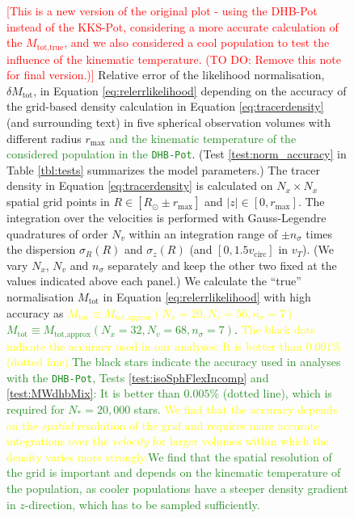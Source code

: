 \documentclass[iop,revtex4,numberedappendix,appendixfloats]{emulateapj}
\newcommand{\NEW}[1]{\textcolor{ForestGreen}{#1}}
\newcommand{\OLD}[1]{\textcolor{Yellow}{#1}}%
\newcommand{\NOTE}[1]{\textcolor{Red}{#1}}
\begin{document}
\begin{figure}[!htbp]
\centering
{}
\caption{\NOTE{[This is a new version of the original plot - using the DHB-Pot instead of the KKS-Pot, considering a more accurate calculation of the $M_\text{tot,true}$, and we also considered a cool population to test the influence of the kinematic temperature. (TO DO: Remove this note for final version.)]} Relative error of the likelihood normalisation, $\delta M_\text{tot}$, in Equation \eqref{eq:relerrlikelihood} depending on the accuracy of the grid-based density calculation in Equation \eqref{eq:tracerdensity} (and surrounding text) in five spherical observation volumes with different radius $r_\text{max}$ \NEW{and the kinematic temperature of the considered population in the \texttt{DHB-Pot}}. (Test \ref{test:norm_accuracy} in Table \ref{tbl:tests} summarizes the model parameters.) The tracer density in Equation \eqref{eq:tracerdensity} is calculated on $N_x\times N_x$ spatial grid points in $R \in [R_\odot \pm r_\text{max}]$ and $|z| \in [0,r_\text{max}]$. The integration over the velocities is performed with Gauss-Legendre quadratures of order $N_v$ within an integration range of $\pm n_\sigma$ times the dispersion $\sigma_R(R)$ and $\sigma_z(R)$ (and $[0,1.5v_\text{circ}]$ in $v_T$). (We vary $N_x$, $N_v$ and $n_\sigma$ separately and keep the other two fixed at the values indicated above each panel.) We calculate the ``true'' normalisation $M_\text{tot}$ in Equation \eqref{eq:relerrlikelihood} with high accuracy as \OLD{$M_\text{tot} \equiv M_\text{tot,approx}(N_x=20,N_v=56,n_\sigma=7)$}\NEW{$M_\text{tot} \equiv M_\text{tot,approx}(N_x=32,N_v=68,n_\sigma=7)$}. \OLD{The black dots indicate the accuracy used in our analyses: It is better than $0.001\%$ (dotted line).}\NEW{The black stars indicate the accuracy used in analyses with the \texttt{DHB-Pot}, Tests \ref{test:isoSphFlexIncomp} and \ref{test:MWdhbMix}: It is better than $0.005\%$ (dotted line), which is required for $N_*=20,000$ stars.} \OLD{We find that the accuracy depends on the \emph{spatial} resolution of the grid and requires more accurate integrations over the \emph{velocity} for larger volumes within which the density varies more strongly.}\NEW{We find that the spatial resolution of the grid is important and depends on the kinematic temperature of the population, as cooler populations have a steeper density gradient in $z$-direction, which has to be sampled sufficiently.}}
\label{fig:norm_accuracy}
\end{figure}
\end{document}
